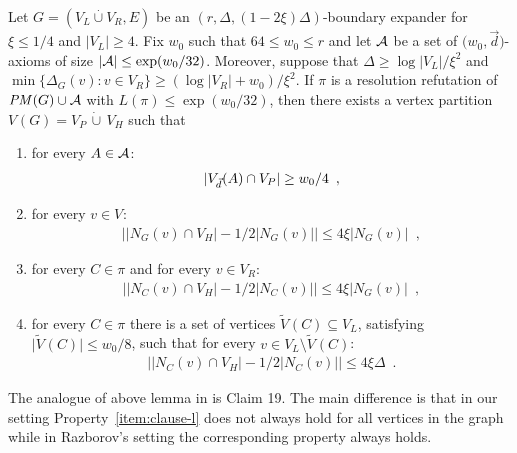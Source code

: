 \documentclass{theoretics}
\providecommand{\abs}[1]{\lvert#1\rvert}
\providecommand{\Abs}[1]{\bigl\lvert#1\bigr\rvert}
\newcommand{\minofset}[3][:]{\min \{ #2 #1 #3 \}}
\newcommand{\setsize}[1]{\lvert#1\rvert}
\newcommand{\disjointunion}{\overset{.}{\cup}}
\newcommand{\eqperiod}{\enspace .}
\newcommand{\eqcomma}{\enspace ,}
\newcommand{\refpi}{\pi}
\newcommand{\genericformsmall}[2]{\mathit{#1}( #2 )}
\newcommand{\length}[1]{\genericformsmall{L}{#1}}
\newcommand{\formulaformat}[1]{\mathit{#1}}
\newcommand{\PM}{PM(G)}
\renewcommand{\PM}{\formulaformat{PM}(G)}
\newcommand{\neigh}[2][]{N_{{#1}}(#2)}
\renewcommand{\deg}[2][XXXXXXXXXXXX]{\Delta_{#1}(#2)}
\newcommand{\diff}{\xi}
\newcommand{\GdegMax}{\Delta}
\newcommand{\V}[1][]{V_{#1}}
\newcommand{\Vl}{\V[L]}
\newcommand{\Vr}{\V[R]}
\newcommand{\Vp}{\V[P]}
\newcommand{\Vh}{\V[H]}
\newcommand{\Vbad}[2][]{\widetilde V^{#1}(#2)}
\newcommand{\Ax}{\ensuremath\mathcal{A}}
\newcommand{\vecthr}{\vec{d}}
\newcommand{\Vfat}[1]{\ensuremath V_{\vecthr}(#1)}
\newcommand{\fakeaxiom}{$\bigl( w_0, \vecthr \bigr)$-axiom\xspace}
\numberwithin{equation}{section}
\begin{document}
\begin{lemma}\label{lem:partition}
  Let $G = ( \Vl \disjointunion \Vr, E)$ be an $(r, \GdegMax, \left( 1 - 2 \diff \right)
  \GdegMax)$-boundary expander for $\diff \leq 1/4$ and $\setsize{\Vl} \geq 4$. Fix $w_0$ such
  that $64\leq w_0 \leq r$ and let $\Ax$ be a set of \fakeaxiom{s}
  of size $\setsize{\Ax} \le \exp({w_0 / 32})$. Moreover, suppose that
  $\GdegMax \geq \log \setsize{\Vl}/\diff^2$ and
  $\minofset{\deg[G]{v}}{v \in \Vr} \geq (\log \setsize{\Vr} + w_0) / \diff^2$.    
  If $\refpi$ is a resolution refutation of $\PM \cup \Ax$ with $\length{\refpi} \leq
  \exp({w_0/32})$, then there exists a vertex partition $\V(G) = \Vp\, \dot \cup\, \Vh$ such that
  \begin{enumerate}
  \item for every $A \in \Ax$: \label{item:thick}\begin{align*}
      \abs{ \Vfat{A} \cap \Vp } \ge w_0 / 4 \eqcomma
    \end{align*}
  \item for every $v \in \V$: \label{item:graph}\begin{align*}
      \Abs{ \abs{ \neigh[G]{v} \cap \Vh } -
      1/2\abs{ \neigh[G]{v} } } \le
      4 \diff \abs{ \neigh[G]{v} }  \eqcomma
    \end{align*}
  \item for every $C \in \refpi$ and for every $v \in \Vr$: \label{item:clause-r}\begin{align*}
      \Abs{ \abs{ \neigh[C]{v} \cap \Vh } -
      1/2\abs{ \neigh[C]{v} } } \le
      4 \diff \abs{ \neigh[G]{v} }  \eqcomma
    \end{align*}
  \item for every $C \in \refpi$ there is a set of vertices $\Vbad{C}
    \subseteq \Vl$, satisfying $\setsize{ \Vbad{C} } \le w_0/8$, such
    that for every $v \in \Vl \setminus
    \Vbad{C}$: \label{item:clause-l}\begin{align*}
      \Abs{ \abs{ \neigh[C]{v} \cap \Vh } -
      1/2\abs{ \neigh[C]{v} } } \le
      4 \diff \GdegMax \eqperiod
    \end{align*}
    \label{item:badset}
  \end{enumerate}
\end{lemma}

The analogue of above lemma in
\cite{Razborov04ResolutionLowerBoundsPM} is Claim 19.  The main
difference is that in our setting Property~\ref{item:clause-l} does
not always hold for all vertices in the graph while in Razborov's
setting the corresponding property always holds.
\end{document}

